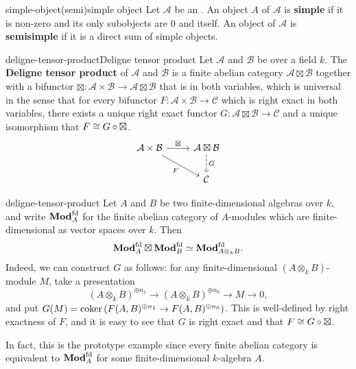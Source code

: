 \begin{topic}{simple-object}{(semi)simple object}
    Let $\mathcal{A}$ be an . An object $A$ of $\mathcal{A}$ is \textbf{simple} if it is non-zero and its only subobjects are $0$ and itself. An object of $\mathcal{A}$ is \textbf{semisimple} if it is a direct sum of simple objects.
\end{topic}

\begin{topic}{deligne-tensor-product}{Deligne tensor product}
    Let $\mathcal{A}$ and $\mathcal{B}$ be   over a field $k$. The \textbf{Deligne tensor product} of $\mathcal{A}$ and $\mathcal{B}$ is a finite abelian category $\mathcal{A} \boxtimes \mathcal{B}$ together with a bifunctor $\boxtimes : \mathcal{A} \times \mathcal{B} \to \mathcal{A} \boxtimes \mathcal{B}$ that is  in both variables, which is universal in the sense that for every bifunctor $F : \mathcal{A} \times \mathcal{B} \to \mathcal{C}$ which is right exact in both variables, there exists a unique right exact functor $G : \mathcal{A} \boxtimes \mathcal{B} \to \mathcal{C}$ and a unique  isomorphism that $F \cong G \circ \boxtimes$.
    \[ \begin{tikzcd}
        \mathcal{A} \times \mathcal{B} \arrow{r}{\boxtimes} \arrow[swap]{dr}{F} & \mathcal{A} \boxtimes \mathcal{B} \arrow[dashed]{d}{G} \\
        & \mathcal{C}
    \end{tikzcd} \]
\end{topic}

\begin{example}{deligne-tensor-product}
    Let $A$ and $B$ be two finite-dimensional algebras over $k$, and write $\textbf{Mod}_A^\textup{fd}$ for the finite abelian category of $A$-modules which are finite-dimensional as vector spaces over $k$. Then
    \[ \textbf{Mod}_A^\textup{fd} \boxtimes \textbf{Mod}_B^\textup{fd} \simeq \textbf{Mod}_{A \otimes_k B}^\textup{fd} . \]
    Indeed, we can construct $G$ as follows: for any finite-dimensional $(A \otimes_k B)$-module $M$, take a presentation
    \[ (A \otimes_k B)^{\oplus n_1} \to (A \otimes_k B)^{\oplus n_0} \to M \to 0 , \]
    and put $G(M) = \operatorname{coker}\left( F(A, B)^{\oplus n_1} \to F(A, B)^{\oplus n_0} \right)$. This is well-defined by right exactness of $F$, and it is easy to see that $G$ is right exact and that $F \cong G \circ \boxtimes$.
    
    In fact, this is the prototype example since every finite abelian category is equivalent to $\textbf{Mod}_A^\textup{fd}$ for some finite-dimensional $k$-algebra $A$.
\end{example}

